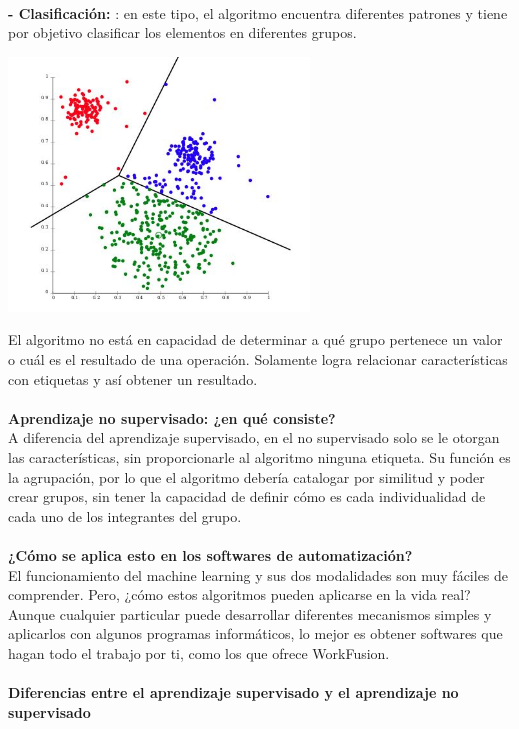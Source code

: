 \documentclass[%
 reprint,
 amsmath,amssymb,
 aps,
]{revtex4-1}
\begin{document}
{ \textbf{}\\  
 \textbf{-  Clasificación: } 
: en este tipo, el algoritmo encuentra diferentes patrones y tiene por objetivo clasificar los elementos en diferentes grupos.
 \begin{center}
\includegraphics[width=8cm]{./Imagenes/clasificacion10}
\end{center}
El algoritmo no está en capacidad de determinar a qué grupo pertenece un valor o cuál es el resultado de una operación. Solamente logra relacionar características con etiquetas y así obtener un resultado.
 \textbf{}\\  
 \textbf{}\\  
\textbf{Aprendizaje no supervisado: ¿en qué consiste?} \\
A diferencia del aprendizaje supervisado, en el no supervisado solo se le otorgan las características, sin proporcionarle al algoritmo ninguna etiqueta. Su función es la agrupación, por lo que el algoritmo debería catalogar por similitud y poder crear grupos, sin tener la capacidad de definir cómo es cada individualidad de cada uno de los integrantes del grupo. \\
 \\
\textbf{¿Cómo se aplica esto en los softwares de automatización?} \\
El funcionamiento del machine learning y sus dos modalidades son muy fáciles de comprender. Pero, ¿cómo estos algoritmos pueden aplicarse en la vida real? Aunque cualquier particular puede desarrollar diferentes mecanismos simples y aplicarlos con algunos programas informáticos, lo mejor es obtener softwares que hagan todo el trabajo por ti, como los que ofrece WorkFusion.
\textbf{}\\  
\textbf{}\\  
\textbf{Diferencias entre el aprendizaje supervisado y el aprendizaje no supervisado} \\
}
\end{document}
